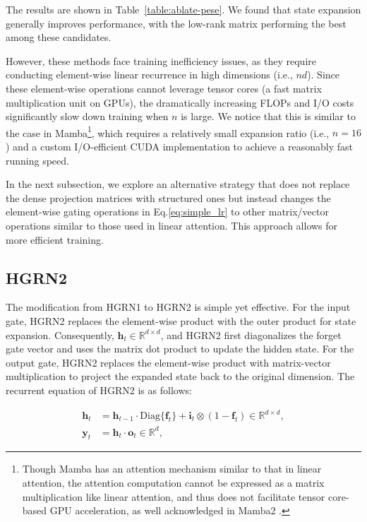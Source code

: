 The results are shown in Table~\ref{table:ablate-pese}. We found that state expansion generally improves performance, with the low-rank matrix performing the best among these candidates.

However, these methods face training inefficiency issues, as they require conducting element-wise linear recurrence in high dimensions (i.e., \(nd\)). Since these element-wise operations cannot leverage tensor cores (a fast matrix multiplication unit on GPUs), the dramatically increasing FLOPs and I/O costs significantly slow down training when \(n\) is large. We notice that this is similar to the case in Mamba\footnote{Though Mamba has an attention mechanism \citep{Ali2024TheHA} similar to that in linear attention, the attention computation cannot be expressed as a matrix multiplication like linear attention, and thus does not facilitate tensor core-based GPU acceleration, as well acknowledged in Mamba2 \citep{Dao2024TransformersAS}. }, which requires a relatively small expansion ratio (i.e., \(n=16\)) and a custom I/O-efficient CUDA implementation to achieve a reasonably fast running speed.

In the next subsection, we explore an alternative strategy that does not replace the dense projection matrices with structured ones but instead changes the element-wise gating operations in Eq.\ref{eq:simple_lr}  to other matrix/vector operations similar to those used in linear attention. This approach allows for more efficient training.

\subsection{HGRN2}

The modification from HGRN1 to HGRN2 is simple yet effective. For the input gate, HGRN2 replaces the element-wise product with the outer product for state expansion. Consequently, \(\mathbf{h}_t \in \mathbb{R}^{d \times d}\), and HGRN2 first diagonalizes the forget gate vector and uses the matrix dot product to update the hidden state. For the output gate, HGRN2 replaces the element-wise product with matrix-vector multiplication to project the expanded state back to the original dimension. The recurrent equation of HGRN2 is as follows:

\begin{equation}
\label{eq:hgrn2}
\begin{aligned}
    \mathbf{h}_t &=   \mathbf{h}_{t-1} \cdot \mathrm{Diag}\{\mathbf{f}_t\} + \mathbf{i}_t   \otimes(1 - \mathbf{f}_t)  \in \mathbb{R}^{d \times d} , \\
    \mathbf{y}_t &= \mathbf{h}_t \cdot \mathbf{o}_t \in \mathbb{R}^{d},
\end{aligned}
\end{equation}

